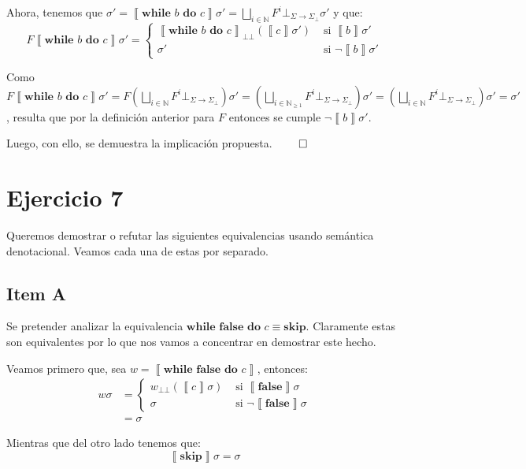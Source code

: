 \documentclass{article}
\newcommand{\sem}[1]{\left\llbracket #1\right\rrbracket}
\newcommand{\N}{\mathbb{N}}
\newcommand{\supr}{\bigsqcup\limits}
\newcommand{\cdom}{\Sigma \to \Sigma_\bot}
\newcommand{\cfbot}{\bot_{\cdom}}
\newcommand{\bbot}{\bot\!\!\!\bot}
\newcommand{\cfalse}{\textbf{false}}
\newcommand{\cskip}{\textbf{skip}}
\newcommand{\cwhile}[2]{\textbf{while }#1\textbf{ do }#2}
\begin{document}
Ahora, tenemos que $\sigma' = \sem{\cwhile{b}{c}} \sigma' = \supr_{i \in \N} F^i \cfbot \sigma'$ y que:
\begin{equation*}
  F \sem{\cwhile{b}{c}} \sigma' = \begin{cases}
    \sem{\cwhile{b}{c}}_{\bbot} (\sem{c}\sigma') &\text{ si } \sem{b}\sigma' \\ 
    \sigma' &\text{ si } \neg\sem{b}\sigma'
  \end{cases}
\end{equation*}

Como $F \sem{\cwhile{b}{c}} \sigma' = F \left(\supr_{i \in \N} F^i \cfbot\right) \sigma' = \left(\supr_{i \in \N_{\geq 1}} F^i \cfbot\right) \sigma' = \left(\supr_{i \in \N} F^i \cfbot\right) \sigma' = \sigma'$, resulta que por la definición anterior para $F$ entonces se cumple $\neg\sem{b}\sigma'$.

Luego, con ello, se demuestra la implicación propuesta. $\qed$

\section*{Ejercicio 7}
Queremos demostrar o refutar las siguientes equivalencias usando semántica denotacional.
Veamos cada una de estas por separado.

\subsection*{Item A}
Se pretender analizar la equivalencia $\cwhile{\cfalse}{c} \equiv \cskip$.
Claramente estas son equivalentes por lo que nos vamos a concentrar en demostrar este hecho.

Veamos primero que, sea $w = \sem{\cwhile{\cfalse}{c}}$, entonces:
\begin{equation*}
  \begin{aligned}
    w \sigma &= \begin{cases}
      w_{\bbot} (\sem{c}\sigma) &\text{ si } \sem{\cfalse}\sigma \\ 
      \sigma &\text{ si }\neg\sem{\cfalse}\sigma 
    \end{cases} \\ 
             &= \sigma
  \end{aligned}
\end{equation*}

Mientras que del otro lado tenemos que:
\begin{equation*}
  \sem{\cskip} \sigma = \sigma
\end{equation*}
\end{document}
